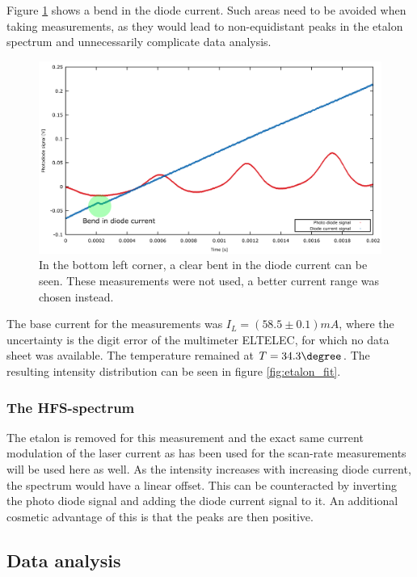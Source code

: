 Figure \ref{fig:bendincurve} shows a bend in the diode current. Such areas need to be avoided when taking measurements, as they would lead to non-equidistant peaks in the etalon spectrum and unnecessarily complicate data analysis.
\begin{figure}
	\centering
	\includegraphics[width=1.0\linewidth]{graphics/bendincurve}
	\caption[Bend in modulating current]{In the bottom left corner, a clear bent in the diode current can be seen. These measurements were not used, a better current range was chosen instead.}
	\label{fig:bendincurve}
\end{figure}
The base current for the measurements was $I_L=\unit{(58.5\pm0.1)}{mA}$, where the uncertainty is the digit error of the multimeter ELTELEC, for which no data sheet was available. The temperature remained at $T=\unit{34.3}{\degree}$. The resulting intensity distribution can be seen in figure \ref{fig:etalon_fit}.

\subsubsection*{The HFS-spectrum}
The etalon is removed for this measurement and the exact same current modulation of the laser current as has been used for the scan-rate measurements will be used here as well. As the intensity increases with increasing diode current, the spectrum would have a linear offset. This can be counteracted by inverting the photo diode signal and adding the diode current signal to it. An additional cosmetic advantage of this is that the peaks are then positive.


\subsection{Data analysis}
